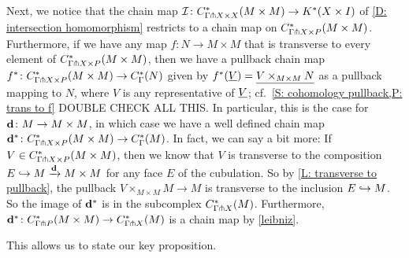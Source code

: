 \documentclass{amsart}
\begin{document}
Next, we notice that the chain map $\mathcal{I} \colon C^*_{\Gamma \pitchfork X\times X}(M\times M) \to K^*(X \times I)$ of \cref{D: intersection homomorphism} restricts to a chain map on $C^*_{\Gamma \pitchfork X\times P}(M\times M)$.
Furthermore, if we have any map $f \colon N \to M \times M$ that is transverse to every element of $C^*_{\Gamma \pitchfork X\times P}(M\times M)$, then we have a pullback chain map $f^* \colon C^*_{\Gamma \pitchfork X\times P}(M\times M) \to C^*_\Gamma(N)$ given by $f^*(\underline{V}) = \underline{V \times_{M \times M} N}$ as a pullback mapping to $N$, where $V$ is any representative of $\underline{V}$; cf.\ \cref{S: cohomology pullback,P: trans to f} DOUBLE CHECK ALL THIS.
In particular, this is the case for $\mathbf{d} \colon M \to M \times M$, in which case we have a well defined chain map $\mathbf{d}^* \colon C^*_{\Gamma \pitchfork X\times P}(M\times M) \to C^*_\Gamma(M)$.
In fact, we can say a bit more: If $V \in  C^*_{\Gamma \pitchfork X\times P}(M\times M)$, then we know that $V$ is transverse to the composition $E \hookrightarrow M \xrightarrow{\mathbf{d}} M \times M$ for any face $E$ of the cubulation.
So by \cref{L: transverse to pullback}, the pullback $V \times_{M \times M} M \to M$ is transverse to the inclusion $E \hookrightarrow M$.
So the image of $\mathbf{d}^*$ is in the subcomplex $C^*_{\Gamma \pitchfork X}(M)$.
Furthermore, $\mathbf{d}^* \colon C^*_{\Gamma \pitchfork P}(M \times M) \to C^*_{\Gamma \pitchfork X}(M)$ is a chain map by \cref{leibniz}.

This allows us to state our key proposition.
\end{document}
